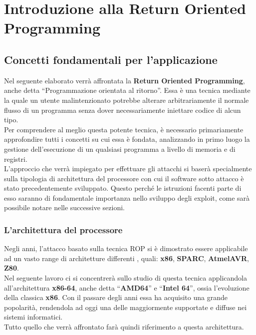\chapter{Introduzione alla Return Oriented Programming}
\label{chap:ROP}

\section{Concetti fondamentali per l'applicazione}
\label{sec:fondamentals}

Nel seguente elaborato verrà affrontata la \textbf{Return Oriented Programming}, anche detta ``Programmazione orientata al ritorno''. Essa è una tecnica
mediante la quale un utente malintenzionato potrebbe alterare arbitrariamente il normale flusso di un programma 
senza dover necessariamente iniettare codice di alcun tipo.\cite*{ROP-General}\\
Per comprendere al meglio questa potente tecnica, è necessario primariamente approfondire tutti i concetti su cui essa è fondata, 
analizzando in primo luogo la gestione dell'esecuzione di un qualsiasi programma a livello
di memoria e di registri.\\
L'approccio che verrà impiegato per effettuare gli attacchi si baserà specialmente sulla tipologia di architettura del processore con cui il
software sotto attacco è stato precedentemente sviluppato. Questo perché le istruzioni facenti parte di esso saranno di fondamentale importanza nello sviluppo degli exploit,
come sarà possibile notare nelle successive sezioni.

\subsection{L'architettura del processore}
\label{subsec:arch}
Negli anni, l'attacco basato sulla tecnica ROP si è dimostrato essere applicabile ad un vasto range di architetture differenti \cite*{ROP-architecture}, quali: \textbf{x86}\cite*{ROP-x86},
\textbf{SPARC}\cite*{ROP-General}, \textbf{AtmelAVR}\cite*{ROP-AtmelAVR}, \textbf{Z80}\cite*{ROP-Z80}.\\
Nel seguente lavoro ci si concentrerà sullo studio di questa tecnica applicandola all'architettura \textbf{x86-64}, anche detta ``\textbf{AMD64}'' e ``\textbf{Intel 64}'', ossia l'evoluzione 
della classica \textbf{x86}. Con il passare degli anni essa ha acquisito una grande popolarità, rendendola ad oggi una delle maggiormente supportate e diffuse nei sistemi informatici.\\
Tutto quello che verrà affrontato farà quindi riferimento a questa architettura.

